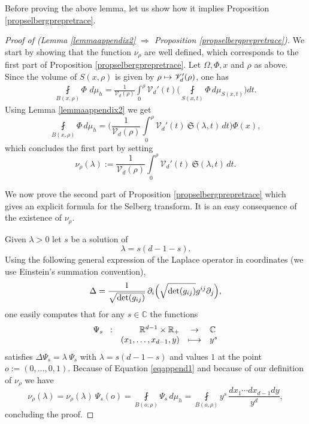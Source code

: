 \documentclass[JEP,XML,SOM,Unicode,NoFloatCountersInSection,published]{cedram}
\let\mathcal\mathscr
\def\mto{\mathchoice{\longmapsto}{\mapsto}{\mapsto}{\mapsto}}
\theoremstyle{plain}
\theoremstyle{definition}
\newcommand{\RR}{\mathbb{R}}
\newcommand{\CC}{\mathbb{C}}
\newcommand{\inte}[1]{\underset{#1}{\int}}
\newcommand{\finte}[3]{\underset{#1}{\fint} {#2} \, {#3}}
\newcommand{\fonction}[5]{\begin{array}{r r c l}
#1 \hspace{2mm} : & #2 & \displaystyle\to & #3 \\
& #4 & \displaystyle\mto & #5 \\
\end{array}}
\begin{document}
Before proving the above lemma, let us show how it implies Proposition \ref{propselbergprepretrace}.

\begin{proof}[Proof of (Lemma \ref{lemmaappendix2} $\Rightarrow$ Proposition \ref{propselbergprepretrace})]
We start by showing that the function $\nu_{\rho}$ are well defined, which corresponds to the first part of Proposition \ref{propselbergprepretrace}. Let $\Omega, \Phi, x$ and $\rho$ as above. Since the volume of $S(x, \rho)$ is given by $\rho \mto \mathcal{V}_d'(\rho)$, one has
\begin{align*}
\finte{B(x,\rho)} \Phi \,d \mu_h = \frac{1}{\mathcal{V}_d(\rho)} \inte{0}^{\rho}
\mathcal{V}_d'(t) \biggl(\finte{S(x, t)}{\Phi}{ d \mu_{S(x,t)}} \biggr) dt.
\end{align*}
Using Lemma \ref{lemmaappendix2} we get
\begin{equation}
\label{eqappend1}
\finte{B(x,\rho)}{\Phi}{d \mu_h} = \biggl(\frac{1}{\mathcal{V}_d(\rho)} \inte{0}^{\rho}
\mathcal{V}_d'(t) \ \mathfrak{S}(\lambda,t) \,dt \biggr) \Phi(x),
\end{equation}
which concludes the first part by setting
\[
\nu_{\rho}(\lambda) := \frac{1}{\mathcal{V}_d(\rho)} \inte{0}^{\rho}
\mathcal{V}_d'(t) \ \mathfrak{S}(\lambda,t) \,dt.
\]

We now prove the second part of Proposition \ref{propselbergprepretrace} which gives an explicit formula for the Selberg transform. It is an easy consequence of the existence of $\nu_\rho$.

Given $\lambda > 0$ let $s$ be a solution of
\[
\lambda = s (d-1-s).
\]
Using the following general expression of the Laplace operator in coordinates (we use Einstein's summation convention),
\[
\Delta = \frac{1}{\sqrt{\det(g_{ij})}}\, \partial_i \Bigl(\sqrt{\det(g_{ij})} g^{ij} \partial_j \Bigr),
\]
one easily computes that for any $s \in \CC$ the functions
\[
\fonction{\Psi_{s}}{\RR^{d-1} \times \RR_+}{\CC}{(x_1,\dots, x_{d-1}, y)}{y^s}
\]
satisfies $\Delta \Psi_{s} = \lambda \ \Psi_{s}$ with $\lambda = s(d-1-s)$ and values $1$ at the point $o := (0,\dots,0, 1)$.
Because of Equation \ref{eqappend1} and because of our definition of $\nu_{\rho}$ we have
\[
\nu_{\rho}(\lambda) = \nu_{\rho}(\lambda) \ \Psi_{s}(o) = \underset{{B(o,\rho)}}{\fint} \Psi_{s} \,d \mu_h = \finte{B(o,\rho)} { y^s}{ \frac{dx_1\cdots dx_{d-1} dy}{y^d}},
\]
concluding the proof.
\end{proof}
\end{document}
